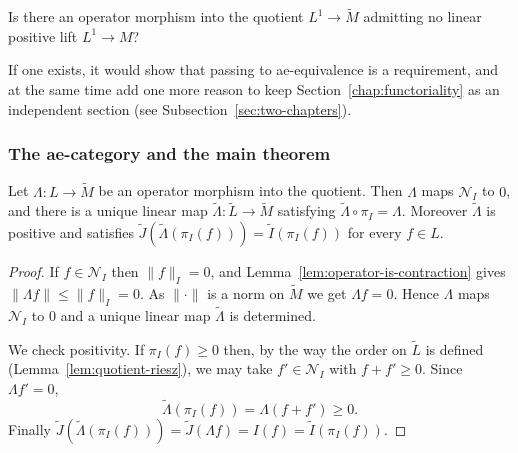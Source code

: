 \begin{problem}\label{prob:no-lift}
  Is there an operator morphism into the quotient $L^1\to\widetilde{M}$
  admitting no linear positive lift $L^1\to M$?

  If one exists, it would show that passing to ae-equivalence is a requirement,
  and at the same time add one more reason to keep
  Section~\ref{chap:functoriality} as an independent section (see
  Subsection~\ref{sec:two-chapters}).
\end{problem}

\subsubsection{The ae-category and the main theorem}

\begin{lemma}\label{lem:operator-descends}
  Let $\Lambda:L\to\widetilde{M}$ be an operator morphism into the quotient.
  Then $\Lambda$ maps $\mathcal{N}_I$ to $0$, and there is a unique linear map
  $\widetilde{\Lambda}:\widetilde{L}\to\widetilde{M}$ satisfying
  $\widetilde{\Lambda}\circ\pi_I=\Lambda$.
  Moreover $\widetilde{\Lambda}$ is positive and satisfies
  $\widetilde{J}(\widetilde{\Lambda}(\pi_I(f)))=\widetilde{I}(\pi_I(f))$ for
  every $f\in L$.
\end{lemma}
\begin{proof}
  If $f\in\mathcal{N}_I$ then $\|f\|_I=0$, and
  Lemma~\ref{lem:operator-is-contraction} gives
  $\|\Lambda f\|\le\|f\|_I=0$.
  As $\|\cdot\|$ is a norm on $\widetilde{M}$ we get $\Lambda f=0$.
  Hence $\Lambda$ maps $\mathcal{N}_I$ to $0$ and a unique linear map
  $\widetilde{\Lambda}$ is determined.

  We check positivity. If $\pi_I(f)\ge0$ then, by the way the order on
  $\widetilde{L}$ is defined (Lemma~\ref{lem:quotient-riesz}), we may take
  $f'\in\mathcal{N}_I$ with $f+f'\ge0$.
  Since $\Lambda f'=0$,
  \[
    \widetilde{\Lambda}(\pi_I(f))=\Lambda(f+f')\ge0 .
  \]
  Finally
  $\widetilde{J}(\widetilde{\Lambda}(\pi_I(f)))=\widetilde{J}(\Lambda f)=I(f)=\widetilde{I}(\pi_I(f))$.
\end{proof}

